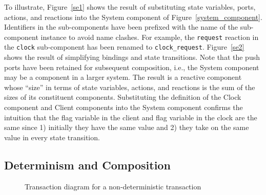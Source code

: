 To illustrate, Figure~\ref{se1} shows the result of substituting state variables, ports, actions, and reactions into the System component of Figure~\ref{system_component}.
Identifiers in the sub-components have been prefixed with the name of the sub-component instance to avoid name clashes.
For example, the \verb+request+ reaction in the \verb+clock+ sub-component has been renamed to \verb+clock_request+.
Figure~\ref{se2} shows the result of simplifying bindings and state transitions.
Note that the push ports have been retained for subsequent composition, i.e., the System component may be a component in a larger system.
The result is a reactive component whose ``size'' in terms of state variables, actions, and reactions is the sum of the sizes  of its constituent components.
Substituting the definition of the Clock component and Client components into the System component confirms the intuition that the flag variable in the client and flag variable in the clock are the same since 1) initially they have the same value and 2) they take on the same value in every state transition.

\subsection{Determinism and Composition}
\label{determinism}

\begin{figure}
\centering
\cprotect\caption{Transaction diagram for a non-deterministic transaction}
\label{ndt}
\end{figure}

